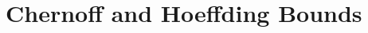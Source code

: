 \documentclass[main.tex]{subfiles}
\begin{document}
\minispacing

\section{Chernoff and Hoeffding Bounds}
\end{document}
